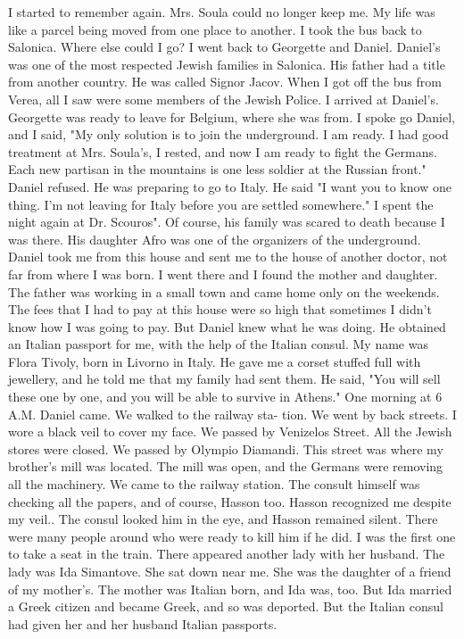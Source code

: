 I started to remember again. Mrs. Soula could no longer keep me. 
My life was like a parcel being moved from one place to another. I took 
the bus back to Salonica. Where else could I go? I went back to Georgette and Daniel. Daniel’s was one of the most respected Jewish families in Salonica. His father had a title from another country. He was called Signor Jacov. 
When I got off the bus from Verea, all I saw were some members of 
the Jewish Police. I arrived at Daniel's. Georgette was ready to leave 
for Belgium, where she was from. I spoke go Daniel, and I said, "My 
only solution is to join the underground. I am ready. I had good treatment
at Mrs. Soula's, I rested, and now I am ready to fight the Germans. 
Each new partisan in the mountains is one less soldier at the Russian 
front." Daniel refused. He was preparing to go to Italy. He said "I 
want you to know one thing. I'm not leaving for Italy before you are 
settled somewhere." 
I spent the night again at Dr. Scouros". Of course, his family was 
scared to death because I was there. His daughter Afro was one of the 
organizers of the underground. Daniel took me from this house and sent 
me to the house of another doctor, not far from where I was born. I 
went there and I found the mother and daughter. The father was working 
in a small town and came home only on the weekends. The fees that I had 
to pay at this house were so high that sometimes I didn't know how I was going to pay. But Daniel knew what he was doing. He obtained an Italian passport for me, with the help of the Italian consul. My name was Flora Tivoly, born in Livorno in Italy. He gave me a corset stuffed full with jewellery, and he told me that my family had sent them. He said, 
"You will sell these one by one, and you will be able to survive in 
Athens." 
One morning at 6 A.M. Daniel came. We walked to the railway sta-
tion. We went by back streets. I wore a black veil to cover my face. 
We passed by Venizelos Street. All the Jewish stores were closed. We 
passed by Olympio Diamandi. This street was where my brother's mill was 
located. The mill was open, and the Germans were removing all the machinery. We came to the railway station. The consult himself was checking all the papers, and of course, Hasson too. Hasson recognized me despite my veil.. The consul looked him in the eye, and Hasson remained silent. There were many people around who were ready to kill him if he 
did. 
I was the first one to take a seat in the train. There appeared 
another lady with her husband. The lady was Ida Simantove. She sat 
down near me. She was the daughter of a friend of my mother's. The mother was Italian born, and Ida was, too. But Ida married a Greek citizen and became Greek, and so was deported. But the Italian consul had given her and her husband Italian passports. 
